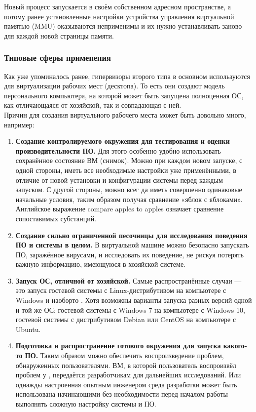 \documentclass[14pt, a4paper]{article}
\begin{document}
Новый процесс запускается в своём собственном адресном пространстве, а потому ранее
установленные настройки устройства управления виртуальной памятью (MMU) оказываются
неприменимы и их нужно устанавливать заново для каждой новой страницы памяти.\\

\subsubsection*{Типовые сферы применения}

Как уже упоминалось ранее, гипервизоры второго типа в основном используются для виртуализации
рабочих мест (десктопа). То есть они создают модель персонального компьютера, на которой может
быть запущена полноценная ОС, как отличающаяся от хозяйской, так и совпадающая с ней.\\

Причин для создания виртуального рабочего места может быть довольно много, например:

\begin{enumerate}
    \item \textbf{Создание контролируемого окружения для тестирования и оценки производительности
    ПО.} Для этого особенно удобно использовать сохранённое состояние ВМ (снимок). Можно при
    каждом новом запуске, с одной стороны, иметь все необходимые настройки уже
    применёнными, в отличие от новой установки и конфигурации системы перед каждым
    запуском. С другой стороны, можно всег да иметь совершенно одинаковые начальные условия,
    таким образом получая сравнение «яблок с яблоками». Английское выражение compare apples
    to apples означает сравнение сопоставимых субстанций.
    \item \textbf{Создание сильно ограниченной песочницы для исследования поведения ПО и системы
    в целом.} В виртуальной машине можно безопасно запускать ПО, заражённое вирусами, и
    исследовать их поведение, не рискуя потерять важную информацию, имеющуюся в хозяйской
    системе.
    \item \textbf{Запуск ОС, отличной от хозяйской.} Самые распространённые случаи — это запуск гостевой
    системы с Linux-дистрибутивом на компьютере с Windows и наоборто . Хотя возможны
    варианты запуска разных версий одной и той же ОС: гостевой системы с Windows 7 на
    компьютере с Windows 10, гостевой системы с дистрибутивом Debian или CentOS на
    компьютере с Ubuntu.
    \item \textbf{Подготовка и распространение готового окружения для запуска какого-то ПО.} Таким
    образом можно обеспечить воспроизведение проблем, обнаруженных пользователями. ВМ, в
    которой пользователь воспроизвёл проблем у , передаётся разработчикам для дальнейших
    исследований. Или однажды настроенная опытным инженером среда разработки может быть
    использована начинающими без необходимости перед началом работы выполнять сложную
    настройку системы и ПО.
\end{enumerate}
\end{document}
